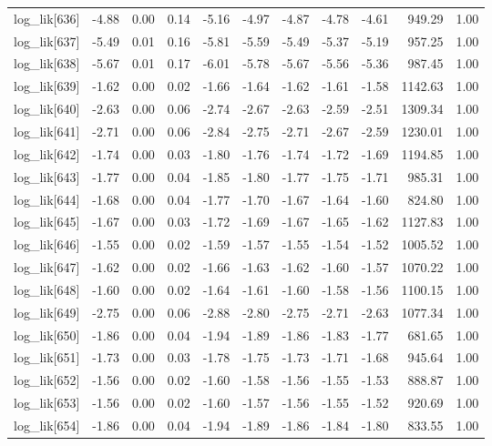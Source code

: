 \begin{table}[ht]
\begin{tabular}{rrrrrrrrrrr}
  log\_lik[636] & -4.88 & 0.00 & 0.14 & -5.16 & -4.97 & -4.87 & -4.78 & -4.61 & 949.29 & 1.00 \\ 
  log\_lik[637] & -5.49 & 0.01 & 0.16 & -5.81 & -5.59 & -5.49 & -5.37 & -5.19 & 957.25 & 1.00 \\ 
  log\_lik[638] & -5.67 & 0.01 & 0.17 & -6.01 & -5.78 & -5.67 & -5.56 & -5.36 & 987.45 & 1.00 \\ 
  log\_lik[639] & -1.62 & 0.00 & 0.02 & -1.66 & -1.64 & -1.62 & -1.61 & -1.58 & 1142.63 & 1.00 \\ 
  log\_lik[640] & -2.63 & 0.00 & 0.06 & -2.74 & -2.67 & -2.63 & -2.59 & -2.51 & 1309.34 & 1.00 \\ 
  log\_lik[641] & -2.71 & 0.00 & 0.06 & -2.84 & -2.75 & -2.71 & -2.67 & -2.59 & 1230.01 & 1.00 \\ 
  log\_lik[642] & -1.74 & 0.00 & 0.03 & -1.80 & -1.76 & -1.74 & -1.72 & -1.69 & 1194.85 & 1.00 \\ 
  log\_lik[643] & -1.77 & 0.00 & 0.04 & -1.85 & -1.80 & -1.77 & -1.75 & -1.71 & 985.31 & 1.00 \\ 
  log\_lik[644] & -1.68 & 0.00 & 0.04 & -1.77 & -1.70 & -1.67 & -1.64 & -1.60 & 824.80 & 1.00 \\ 
  log\_lik[645] & -1.67 & 0.00 & 0.03 & -1.72 & -1.69 & -1.67 & -1.65 & -1.62 & 1127.83 & 1.00 \\ 
  log\_lik[646] & -1.55 & 0.00 & 0.02 & -1.59 & -1.57 & -1.55 & -1.54 & -1.52 & 1005.52 & 1.00 \\ 
  log\_lik[647] & -1.62 & 0.00 & 0.02 & -1.66 & -1.63 & -1.62 & -1.60 & -1.57 & 1070.22 & 1.00 \\ 
  log\_lik[648] & -1.60 & 0.00 & 0.02 & -1.64 & -1.61 & -1.60 & -1.58 & -1.56 & 1100.15 & 1.00 \\ 
  log\_lik[649] & -2.75 & 0.00 & 0.06 & -2.88 & -2.80 & -2.75 & -2.71 & -2.63 & 1077.34 & 1.00 \\ 
  log\_lik[650] & -1.86 & 0.00 & 0.04 & -1.94 & -1.89 & -1.86 & -1.83 & -1.77 & 681.65 & 1.00 \\ 
  log\_lik[651] & -1.73 & 0.00 & 0.03 & -1.78 & -1.75 & -1.73 & -1.71 & -1.68 & 945.64 & 1.00 \\ 
  log\_lik[652] & -1.56 & 0.00 & 0.02 & -1.60 & -1.58 & -1.56 & -1.55 & -1.53 & 888.87 & 1.00 \\ 
  log\_lik[653] & -1.56 & 0.00 & 0.02 & -1.60 & -1.57 & -1.56 & -1.55 & -1.52 & 920.69 & 1.00 \\ 
  log\_lik[654] & -1.86 & 0.00 & 0.04 & -1.94 & -1.89 & -1.86 & -1.84 & -1.80 & 833.55 & 1.00 \\ 

\end{tabular}
\end{table}

